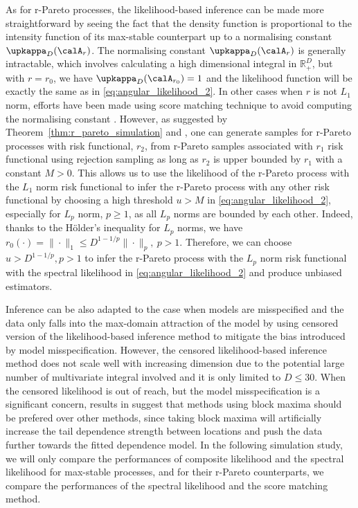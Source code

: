 \documentclass[12pt]{article}
\begin{document}
As for r-Pareto processes, the likelihood-based inference can be made more straightforward by seeing the fact that the density function is proportional to the intensity function of its max-stable counterpart up to a normalising constant $\upkappa_D(\calA_r)$. The normalising constant $\upkappa_D(\calA_r)$ is generally intractable, which involves calculating a high dimensional integral in $\mathbb R_+^D$, but with $r=r_0$, we have $\upkappa_D(\calA_{r_0})=1$ and the likelihood function will be exactly the same as in \eqref{eq:angular_likelihood_2}. In other cases when $r$ is not $L_1$ norm, efforts have been made using score matching technique to avoid computing the normalising constant \citep{deFondeville.Davison:2018}. However, as suggested by Theorem~\ref{thm:r_pareto_simulation} and \citet[Proposition 2]{Dombry.etal:2024}, one can generate samples for r-Pareto processes with risk functional, $r_2$, from r-Pareto samples associated with $r_1$ risk functional using rejection sampling as long as $r_2$ is upper bounded by $r_1$ with a constant $M>0$. This allows us to use the likelihood of the r-Pareto process with the $L_1$ norm risk functional to infer the r-Pareto process with any other risk functional by choosing a high threshold $u>M$ in \eqref{eq:angular_likelihood_2}, especially for $L_p$ norm, $p\geq 1$, as all $L_p$ norms are bounded by each other. Indeed, thanks to the H\"older's inequality for $L_p$ norms, we have $r_0(\cdot)=\|\cdot\|_1 \leq D^{1-1/p}\|\cdot\|_p,\ p>1$. Therefore, we can choose $u>D^{1-1/p}, p>1$ to infer the r-Pareto process with the $L_p$ norm risk functional with the spectral likelihood in \eqref{eq:angular_likelihood_2} and produce unbiased estimators.   

Inference can be also adapted to the case when models are misspecified and the data only falls into the max-domain attraction of the model by using censored version of the likelihood-based inference method \citep{Wadsworth.Tawn:2014, Huser.etal:2016} to mitigate the bias introduced by model misspecification. However, the censored likelihood-based inference method does not scale well with increasing dimension due to the potential large number of multivariate integral involved and it is only limited to $D\leq 30$. When the censored likelihood is out of reach, but the model misspecification is a significant concern, results in \citet{Huser.etal:2016} suggest that methods using block maxima should be prefered over other methods, since taking block maxima will artificially increase the tail dependence strength between locations and push the data further towards the fitted dependence model. In the following simulation study, we will only compare the performances of composite likelihood and the spectral likelihood for max-stable processes, and for their r-Pareto counterparts, we compare the performances of the spectral likelihood and the score matching method. 
\end{document}
